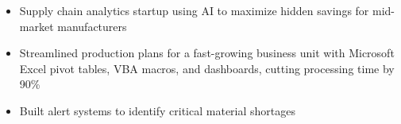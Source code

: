 \begin{itemize}
  \item Supply chain analytics startup using AI to maximize hidden savings for mid-market manufacturers
  \item Streamlined production plans for a fast-growing business unit with Microsoft Excel pivot tables, VBA macros, and dashboards, cutting processing time by 90\%
  \item Built alert systems to identify critical material shortages
\end{itemize}

